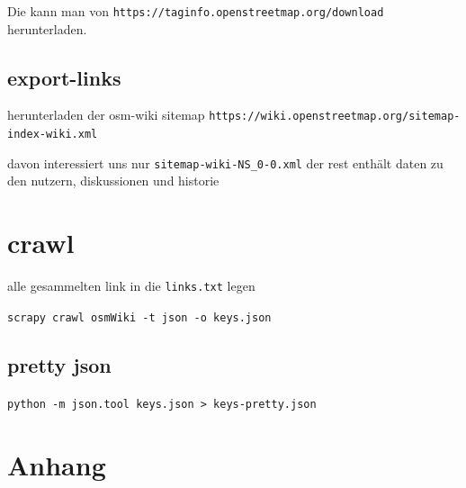 \documentclass[12pt,pdftex,a4paper]{article}
\begin{document}
Die kann man von \texttt{https://taginfo.openstreetmap.org/download} herunterladen.

\subsection{export-links}
herunterladen der osm-wiki sitemap
\texttt{https://wiki.openstreetmap.org/sitemap-index-wiki.xml}


davon interessiert uns nur \texttt{sitemap-wiki-NS\_0-0.xml} der rest enthält daten zu den nutzern, diskussionen und historie

\section{crawl}
alle gesammelten link in die \texttt{links.txt} legen

\texttt{scrapy crawl osmWiki -t json -o keys.json}

\subsection{pretty json}
\texttt{python -m json.tool keys.json > keys-pretty.json}


\pagebreak
\section{Anhang}




\end{document}
